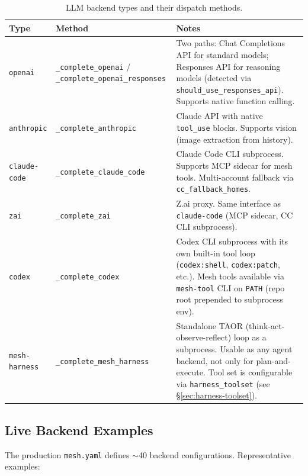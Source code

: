 \documentclass[11pt,a4paper]{article}
\newcommand{\code}[1]{\texttt{#1}}
\begin{document}
\begin{table}[h]
\centering
\small
\begin{tabular}{@{}llL{6.5cm}@{}}
\toprule
\textbf{Type} & \textbf{Method} & \textbf{Notes} \\
\midrule
\code{openai}
  & \code{\_complete\_openai} /
    \code{\_complete\_openai\_responses}
  & Two paths: Chat Completions API for standard models;
    Responses API for reasoning models (detected via
    \code{should\_use\_responses\_api}). Supports native
    function calling. \\
\addlinespace
\code{anthropic}
  & \code{\_complete\_anthropic}
  & Claude API with native \code{tool\_use} blocks. Supports
    vision (image extraction from history). \\
\addlinespace
\code{claude-code}
  & \code{\_complete\_claude\_code}
  & Claude Code CLI subprocess. Supports MCP sidecar for
    mesh tools. Multi-account fallback via
    \code{cc\_fallback\_homes}. \\
\addlinespace
\code{zai}
  & \code{\_complete\_zai}
  & Z.ai proxy. Same interface as \code{claude-code}
    (MCP sidecar, CC CLI subprocess). \\
\addlinespace
\code{codex}
  & \code{\_complete\_codex}
  & Codex CLI subprocess with its own built-in tool loop
    (\code{codex:shell}, \code{codex:patch}, etc.).
    Mesh tools available via \code{mesh-tool} CLI on
    \code{PATH} (repo root prepended to subprocess env). \\
\addlinespace
\code{mesh-harness}
  & \code{\_complete\_mesh\_harness}
  & Standalone TAOR (think-act-observe-reflect) loop
    as a subprocess. Usable as any agent backend, not
    only for plan-and-execute. Tool set is configurable
    via \code{harness\_toolset} (see
    \S\ref{sec:harness-toolset}). \\
\bottomrule
\end{tabular}
\caption{LLM backend types and their dispatch methods.}
\label{tab:backends}
\end{table}

\subsection{Live Backend Examples}

The production \code{mesh.yaml} defines $\sim$40 backend configurations.
Representative examples:
\end{document}
